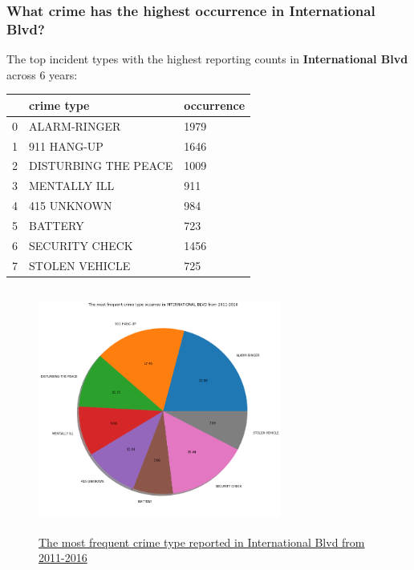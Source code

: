 \documentclass{article} %
\begin{document}
\subsubsection{What crime has the highest occurrence in International Blvd?}

The top incident types with the highest reporting counts in \textbf{International Blvd} across 6 years:

\begin{center}
\begin{tabular}{|p{1cm}|p{6cm}|p{3cm}|}
	\toprule
	{} &            crime type &  occurrence \\
	\midrule
	0 &          ALARM-RINGER &        1979 \\
	1 &           911 HANG-UP &        1646 \\
	2 &  DISTURBING THE PEACE &        1009 \\
	3 &          MENTALLY ILL &         911 \\
	4 &           415 UNKNOWN &         984 \\
	5 &               BATTERY &         723 \\
	6 &        SECURITY CHECK &        1456 \\
	7 &        STOLEN VEHICLE &         725 \\
	\bottomrule
\end{tabular}
\end{center}


\begin{figure}[H]
	\begin{center}
		\includegraphics[height=8cm, width=8cm]{4.png}
	\end{center}
	\caption{\hyperref[appendix:plot3]{The most frequent crime type reported in International Blvd from 2011-2016}}
\end{figure}
\end{document}
